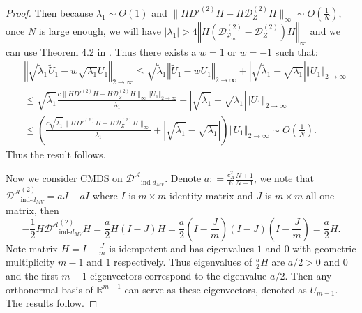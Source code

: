 \documentclass[12pt]{article}
\newcommand{\RR}{\mathbb{R}}
\theoremstyle{definition}
\begin{document}
\begin{proof}
Then because $\lambda_1 \sim \Theta(1)$ and  $\|HD'^{(2)}H -H\mathcal{D}_Z^{(2)}H\|_{\infty} \sim O\left(\frac{1}{N}\right)$, once $N$ is large enough, we will have $|\lambda_1|>4\left\Vert H\left(\mathcal{D}^{(2)}_{\varphi_m}-\mathcal{D}^{(2)}_Z\right)H\right\Vert_{\infty}$ and we can use Theorem 4.2 in \cite{cape2019two}. Thus there exists a $w=1$ or $w=-1$ such that:
\begin{align*}
&\left\Vert \sqrt{\tilde{\lambda}_1}\tilde{U}_1-w\sqrt{\lambda_1}U_1  \right\Vert_{2 \to \infty}  \leq \sqrt{ \tilde{\lambda}_1} \left\Vert \tilde{U}_1-wU_1\right\Vert_{2 \to \infty} + \left|\sqrt{\tilde{\lambda}_1} -\sqrt{\lambda_1}\right|\left\Vert U_1 \right\Vert_{2 \to \infty}  \\
&\leq  \sqrt{ \tilde{\lambda}_1}\frac{c\|HD'^{(2)}H -H\mathcal{D}_Z^{(2)}H\|_{\infty} \left\Vert U_1 \right\Vert_{2 \to \infty} }{\lambda_1}
+\left|\sqrt{\tilde{\lambda}_1} -\sqrt{\lambda_1}\right|\left\Vert U_1 \right\Vert_{2 \to \infty} \\
& \leq \left( \frac{ c \sqrt{ \tilde{\lambda}_1} \|HD'^{(2)}H -H\mathcal{D}_Z^{(2)}H\|_{\infty}}{\lambda_1}+\left|\sqrt{\tilde{\lambda}_1} -\sqrt{\lambda_1}\right| \right) \left\Vert U_1 \right\Vert_{2 \to \infty} \sim O\left(\frac{1}{N}\right). 
\end{align*}
Thus the result follows.

Now we consider CMDS on $\mathcal{D^A}_{\text{ind-}d_{MV}}$. Denote $a : = \frac{c_A^2}{6}\frac{N+1}{N-1}$, we note that $\mathcal{D^A}^{(2)}_{\text{ind-}d_{MV}} = a J - aI$ where $I$ is $m \times m$ identity matrix and $J$ is $m \times m$ all one matrix, then 
$$
-\frac{1}{2}H\mathcal{D^A}^{(2)}_{\text{ind-}d_{MV}}H = \frac{a}{2}H(I - J  )H = \frac{a}{2}\left( I - \frac{J}{m} \right)\left(I - J  \right) \left( I - \frac{J}{m} \right)    = \frac{a}{2}H.
$$
Note matrix $H= I - \frac{J}{m}$ is idempotent and has eigenvalues $1$ and $0$ with geometric multiplicity $m-1$ and $1$ respectively. Thus eigenvalues of $\frac{a}{2}H$ are $a/2 > 0$ and $0$ and the first $m-1$ eigenvectors correspond to the eigenvalue $a/2$. Then any orthonormal basis of $\RR^{m-1}$ can serve as these eigenvectors, denoted as $U_{m-1}$. The results follow.  



\end{proof}
\end{document}
